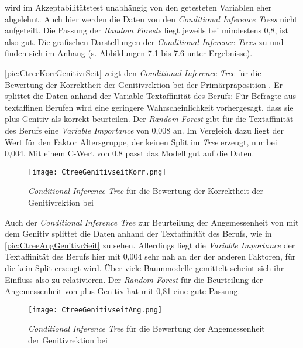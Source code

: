  wird im Akzeptabilitätstest unabhängig von den getesteten Variablen eher abgelehnt. 
Auch hier werden die Daten von den \textit{Conditional Inference Trees} nicht aufgeteilt. 
Die Passung der \textit{Random Forests} liegt jeweils bei mindestens 0,8, ist also gut. 
Die grafischen Darstellungen der \textit{Conditional Inference Trees} zu \dank{} und \gegenueber{} finden sich im Anhang (s. Abbildungen 7.1 bis 7.6 unter Ergebnisse). 

\autoref{pic:CtreeKorrGenitivrSeit} zeigt den \textit{Conditional Inference Tree} für die Bewertung der Korrektheit der Genitivrektion bei der Primärpräposition .
Er splittet die Daten anhand der Variable \glqq Textaffinität des Berufs\grqq:
Für Befragte aus textaffinen Berufen wird eine geringere Wahrscheinlichkeit vorhergesagt, dass sie  plus Genitiv als korrekt beurteilen. 
Der \textit{Random Forest} gibt für die Textaffinität des Berufs eine \textit{Variable Importance} von 0,008 an. 
Im Vergleich dazu liegt der Wert für den Faktor \glqq Altersgruppe\grqq, der keinen Split im \textit{Tree} erzeugt, nur bei 0,004.
Mit einem C-Wert von 0,8 passt das Modell gut auf die Daten. 

\begin{figure}
\centering
\texttt{[image: CtreeGenitivseitKorr.png]}
\caption{\textit{Conditional Inference Tree }für die Bewertung der Korrektheit der Genitivrektion bei }
\label{pic:CtreeKorrGenitivrSeit}
\end{figure}

Auch der \textit{Conditional Inference Tree} zur Beurteilung der Angemessenheit von  mit dem Genitiv splittet die Daten anhand der Textaffinität des Berufs, wie in \autoref{pic:CtreeAngGenitivrSeit} zu sehen. 
Allerdings liegt die \textit{Variable Importance} der Textaffinität des Berufs hier mit 0,004 sehr nah an der der anderen Faktoren, für die kein Split erzeugt wird. 
Über viele Baummodelle gemittelt scheint sich ihr Einfluss also zu relativieren. 
Der \textit{Random Forest} für die Beurteilung der Angemessenheit von  plus Genitiv hat mit 0,81 eine gute Passung.\largerpage

\begin{figure}
\centering
\texttt{[image: CtreeGenitivseitAng.png]}
\caption{\textit{Conditional Inference Tree} für die Bewertung der Angemessenheit der Genitivrektion bei }
\label{pic:CtreeAngGenitivrSeit}
\end{figure}

